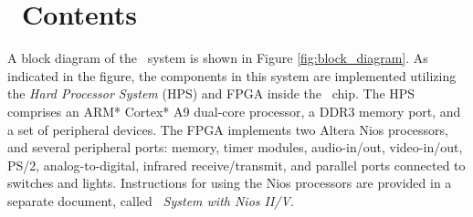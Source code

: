 \section{\systemName~Contents}
A block diagram of the \systemName~system is shown in 
Figure \ref{fig:block_diagram}.  As indicated in the figure, the components in this system 
are implemented utilizing the {\it Hard Processor System} (HPS) and FPGA 
inside the \FPGADeviceFamily~chip. The HPS comprises an ARM* Cortex* A9 dual-core 
processor, a DDR3 memory port, and a set of peripheral devices. The FPGA 
implements two Altera Nios\textsuperscript{\textregistered} processors, and several 
peripheral ports: memory, timer modules, 
audio-in/out, video-in/out, PS/2, analog-to-digital, infrared receive/transmit, and 
parallel ports connected to switches and lights.  Instructions for using the Nios processors
are provided in a separate document, called {\it \systemName~System with Nios II/V}.


